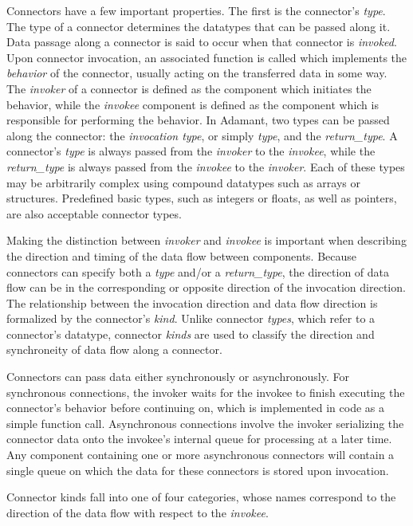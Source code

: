 Connectors have a few important properties. The first is the connector's \textit{type}. The type of a connector determines the datatypes that can be passed along it. Data passage along a connector is said to occur when that connector is \textit{invoked}. Upon connector invocation, an associated function is called which implements the \textit{behavior} of the connector, usually acting on the transferred data in some way. The \textit{invoker} of a connector is defined as the component which initiates the behavior, while the \textit{invokee} component is defined as the component which is responsible for performing the behavior. In Adamant, two types can be passed along the connector: the \textit{invocation type}, or simply \textit{type}, and the \textit{return\_type}. A connector's \textit{type} is always passed from the \textit{invoker} to the \textit{invokee}, while the \textit{return\_type} is always passed from the \textit{invokee} to the \textit{invoker}.  Each of these types may be arbitrarily complex using compound datatypes such as arrays or structures. Predefined basic types, such as integers or floats, as well as pointers, are also acceptable connector types.

Making the distinction between \textit{invoker} and \textit{invokee} is important when describing the direction and timing of the data flow between components. Because connectors can specify both a \textit{type} and/or a \textit{return\_type}, the direction of data flow can be in the corresponding or opposite direction of the invocation direction. The relationship between the invocation direction and data flow direction is formalized by the connector's \textit{kind}. Unlike connector \textit{types}, which refer to a connector's datatype, connector \textit{kinds} are used to classify the direction and synchroneity of data flow along a connector.

Connectors can pass data either synchronously or asynchronously. For synchronous connections, the invoker waits for the invokee to finish executing the connector's behavior before continuing on, which is implemented in code as a simple function call. Asynchronous connections involve the invoker serializing the connector data onto the invokee's internal queue for processing at a later time. Any component containing one or more asynchronous connectors will contain a single queue on which the data for these connectors is stored upon invocation.

Connector kinds fall into one of four categories, whose names correspond to the direction of the data flow with respect to the \textit{invokee}.

